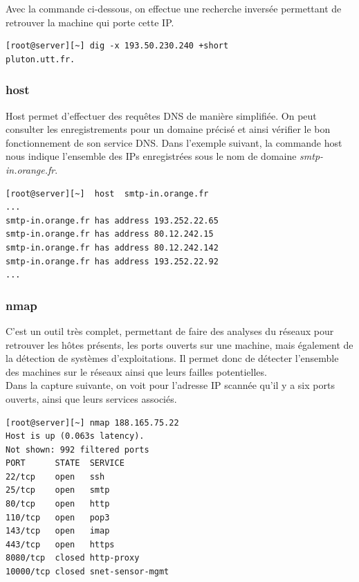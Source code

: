 \documentclass[a4paper,12pt]{article}
\begin{document}
Avec la commande ci-dessous, on effectue une recherche inversée permettant de retrouver la machine qui porte cette IP.

{\footnotesize \begin{verbatim}
[root@server][~] dig -x 193.50.230.240 +short
pluton.utt.fr.
\end{verbatim}}

\subsubsection{host}

Host permet d'effectuer des requêtes DNS de manière simplifiée. On peut consulter les enregistrements pour un domaine précisé et ainsi vérifier le bon fonctionnement de son service DNS. Dans l'exemple suivant, la commande host nous indique l'ensemble des IPs enregistrées sous le nom de domaine \emph{smtp-in.orange.fr}.\\

{\footnotesize \begin{verbatim}
[root@server][~]  host  smtp-in.orange.fr
...
smtp-in.orange.fr has address 193.252.22.65
smtp-in.orange.fr has address 80.12.242.15
smtp-in.orange.fr has address 80.12.242.142
smtp-in.orange.fr has address 193.252.22.92
...
\end{verbatim}}


\subsubsection{nmap}
C'est un outil très complet, permettant de faire des analyses du réseaux pour retrouver les hôtes présents, les ports ouverts sur une machine, mais également de la détection de systèmes d'exploitations. Il permet donc de détecter l'ensemble des machines sur le réseaux ainsi que leurs failles potentielles.\\

\noindent Dans la capture suivante, on voit pour l'adresse IP scannée qu'il y a six ports ouverts, ainsi que leurs services associés.


{\footnotesize \begin{verbatim}
[root@server][~] nmap 188.165.75.22
Host is up (0.063s latency).
Not shown: 992 filtered ports
PORT      STATE  SERVICE
22/tcp    open   ssh
25/tcp    open   smtp
80/tcp    open   http
110/tcp   open   pop3
143/tcp   open   imap
443/tcp   open   https
8080/tcp  closed http-proxy
10000/tcp closed snet-sensor-mgmt
\end{verbatim}}
\end{document}
